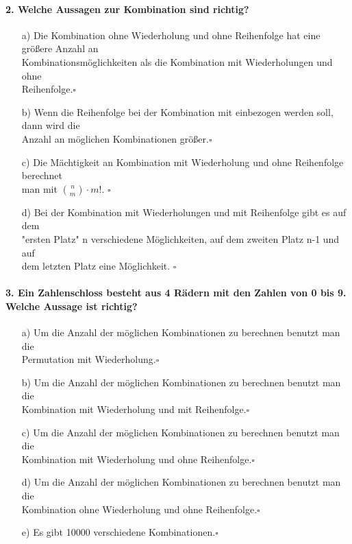 \documentclass[a4paper]{article}
\begin{document}
\paragraph{2. Welche Aussagen zur Kombination sind richtig?}
\begin{itemize}
    \item [a)]Die Kombination ohne Wiederholung und ohne Reihenfolge hat eine größere Anzahl an \\ Kombinationsmöglichkeiten als die Kombination mit Wiederholungen und ohne \\Reihenfolge.\hfill $\square$
    \item[b)]Wenn die Reihenfolge bei der Kombination mit einbezogen werden soll, dann wird die \\Anzahl an möglichen Kombinationen größer.\hfill $\square$
    \item[c)]Die Mächtigkeit an Kombination mit Wiederholung und ohne Reihenfolge berechnet\\ man mit $\binom{n}{m}\cdot m!$. \hfill $\square$
    \item[d)]Bei der Kombination mit Wiederholungen und mit Reihenfolge gibt es auf dem \\"ersten Platz" n verschiedene Möglichkeiten, auf dem zweiten Platz n-1 und auf\\ dem letzten Platz eine Möglichkeit. \hfill $\square$
\end{itemize}
\paragraph{3. Ein Zahlenschloss besteht aus 4 Rädern mit den Zahlen von 0 bis 9. Welche Aussage ist richtig?}
\begin{itemize}
    \item[a)]Um die Anzahl der möglichen Kombinationen zu berechnen benutzt man die\\ Permutation mit Wiederholung.\hfill $\square$
    \item[b)]Um die Anzahl der möglichen Kombinationen zu berechnen benutzt man die\\ Kombination mit Wiederholung und mit Reihenfolge.\hfill $\square$
    \item[c)]Um die Anzahl der möglichen Kombinationen zu berechnen benutzt man die\\ Kombination mit Wiederholung und ohne Reihenfolge.\hfill $\square$
    \item[d)]Um die Anzahl der möglichen Kombinationen zu berechnen benutzt man die\\ Kombination ohne Wiederholung und ohne Reihenfolge.\hfill $\square$
    \item[e)]Es gibt 10000 verschiedene Kombinationen.\hfill $\square$
\end{itemize}
\end{document}
